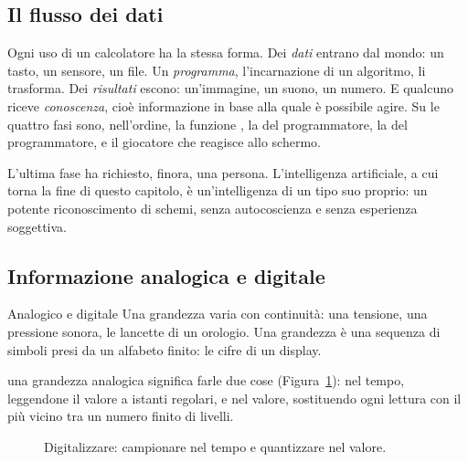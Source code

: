 \subsection{Il flusso dei dati}

Ogni uso di un calcolatore ha la stessa forma. Dei \emph{dati} entrano dal
mondo: un tasto, un sensore, un file. Un \emph{programma}, l'incarnazione di un
algoritmo, li trasforma. Dei \emph{risultati} escono: un'immagine, un suono, un
numero. E qualcuno riceve \emph{conoscenza}, cioè informazione in base alla
quale è possibile agire. Su \prg le quattro fasi sono, nell'ordine, la funzione
, la  del programmatore, la 
del programmatore, e il giocatore che reagisce allo schermo.

L'ultima fase ha richiesto, finora, una persona. L'intelligenza artificiale, a
cui torna la fine di questo capitolo, è un'intelligenza di un tipo suo proprio:
un potente riconoscimento di schemi, senza autocoscienza e senza esperienza
soggettiva.

\subsection{Informazione analogica e digitale}

\begin{definition}{Analogico e digitale}
Una grandezza  varia con continuità: una tensione, una
pressione sonora, le lancette di un orologio. Una grandezza  è
una sequenza di simboli presi da un alfabeto finito: le cifre di un display.
\end{definition}

 una grandezza analogica significa farle due cose
(Figura~\ref{fig:info:sampling}):  nel tempo, leggendone il
valore a istanti regolari, e  nel valore, sostituendo ogni
lettura con il più vicino tra un numero finito di livelli.

\begin{figure}[htb]
\centering
{}
\caption{Digitalizzare: campionare nel tempo e quantizzare nel valore.}
\label{fig:info:sampling}
\end{figure}

